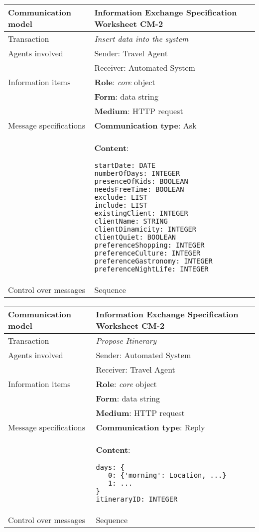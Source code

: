 \begin{tabular}%
      {|p{4cm}%
        |p{8cm}|}
\hline
{\bf Communication model} &
   {\bf Information Exchange Specification Worksheet CM-2} \\
\hline
\hline
\sc Transaction &
   {\em
   Insert data into the system
   } \\
\hline
\sc Agents involved &
   {\rm Sender: Travel Agent} \\
   & {\rm Receiver: Automated System}\\
\hline
\sc Information items 
&  {\bf Role}: {\em core} object
   \\
&  {\bf Form}: data string
   \\
&  {\bf Medium}: HTTP request
   \\
\hline
\sc Message specifications 
&  {\bf Communication type}: Ask
   \\
&  {\bf Content}: 
\begin{lstlisting}[breaklines=true,mathescape=true]
startDate: DATE 
numberOfDays: INTEGER
presenceOfKids: BOOLEAN
needsFreeTime: BOOLEAN
exclude: LIST
include: LIST
existingClient: INTEGER
clientName: STRING 
clientDinamicity: INTEGER
clientQuiet: BOOLEAN
preferenceShopping: INTEGER
preferenceCulture: INTEGER
preferenceGastronomy: INTEGER
preferenceNightLife: INTEGER
\end{lstlisting}
   \\
\hline
\sc Control over messages &
   Sequence
   \\
\hline
\end{tabular}
\newline
\vspace{0.8 cm}
\newline
\noindent
\begin{tabular}%
      {|p{4cm}%
        |p{8cm}|}
\hline
{\bf Communication model} &
   {\bf Information Exchange Specification Worksheet CM-2} \\
\hline
\hline
\sc Transaction &
   {\em
   Propose Itinerary
   } \\
\hline
\sc Agents involved &
   {\rm Sender: Automated System} \\
   & {\rm Receiver: Travel Agent}\\
\hline
\sc Information items 
&  {\bf Role}: {\em core} object
   \\
&  {\bf Form}: data string
   \\
&  {\bf Medium}: HTTP request
   \\
\hline
\sc Message specifications 
&  {\bf Communication type}: Reply
   \\
&  {\bf Content}: 
\begin{lstlisting}[breaklines=true,mathescape=true]
days: {
   0: {'morning': Location, ...}
   1: ...
}
itineraryID: INTEGER
\end{lstlisting}
   \\
\hline
\sc Control over messages &
   Sequence
   \\
\hline
\end{tabular}
